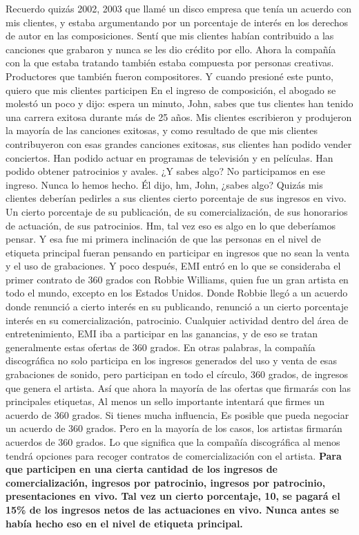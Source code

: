 \documentclass[10pt]{book}
\begin{document}
Recuerdo quizás 2002, 2003 que llamé un disco empresa que tenía un acuerdo con mis clientes, y estaba argumentando por un porcentaje de interés en los derechos de autor en las composiciones. Sentí que mis clientes habían contribuido a las canciones que grabaron y nunca se les dio crédito por ello. Ahora la compañía con la que estaba tratando también estaba compuesta por personas creativas. Productores que también fueron compositores. Y cuando presioné este punto, quiero que mis clientes participen En el ingreso de composición, el abogado se molestó un poco y dijo: espera un minuto, John, sabes que tus clientes han tenido una carrera exitosa durante más de 25 años. Mis clientes escribieron y produjeron la mayoría de las canciones exitosas, y como resultado de que mis clientes contribuyeron con esas grandes canciones exitosas, sus clientes han podido vender conciertos. Han podido actuar en programas de televisión y en películas. Han podido obtener patrocinios y avales. ¿Y sabes algo? No participamos en ese ingreso. Nunca lo hemos hecho. Él dijo, hm, John, ¿sabes algo? Quizás mis clientes deberían pedirles a sus clientes cierto porcentaje de sus ingresos en vivo. Un cierto porcentaje de su publicación, de su comercialización, de sus honorarios de actuación, de sus patrocinios. Hm, tal vez eso es algo en lo que deberíamos pensar. Y esa fue mi primera inclinación de que las personas en el nivel de etiqueta principal fueran pensando en participar en ingresos que no sean la venta y el uso de grabaciones. Y poco después, EMI entró en lo que se consideraba el primer contrato de 360 grados con Robbie Williams, quien fue un gran artista en todo el mundo, excepto en los Estados Unidos. Donde Robbie llegó a un acuerdo donde renunció a cierto interés en su publicando, renunció a un cierto porcentaje interés en su comercialización, patrocinio. Cualquier actividad dentro del área de entretenimiento, EMI iba a participar en las ganancias, y {\color{red} de eso se tratan generalmente estas ofertas de 360 grados. En otras palabras, la compañía discográfica no solo participa en los ingresos generados del uso y venta de esas grabaciones de sonido, pero participan en todo el círculo, 360 grados, de ingresos que genera el artista.} Así que ahora la mayoría de las ofertas que firmarás con las principales etiquetas, Al menos un sello importante intentará que firmes un acuerdo de 360 grados. Si tienes mucha influencia, Es posible que pueda negociar un acuerdo de 360 grados. Pero en la mayoría de los casos, los artistas firmarán acuerdos de 360 grados. Lo que significa que la compañía discográfica al menos tendrá opciones para recoger contratos de comercialización con el artista. \textbf{Para que participen en una cierta cantidad de los ingresos de comercialización, ingresos por patrocinio, ingresos por patrocinio, presentaciones en vivo. Tal vez un cierto porcentaje, 10, se pagará el 15\% de los ingresos netos de las actuaciones en vivo. Nunca antes se había hecho eso en el nivel de etiqueta principal.}\\
\end{document}
